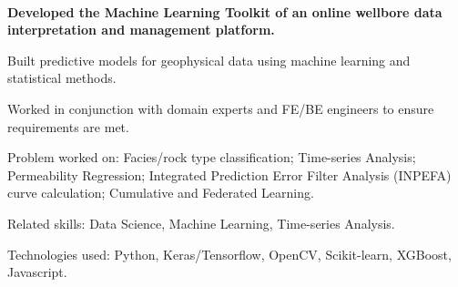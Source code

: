 \\
\vspace{-.2em}
\begin{xitemize}
    \item \textbf{Developed the Machine Learning Toolkit of an online wellbore data interpretation and management platform.}
    \begin{zitemize}
        \item Built predictive models for geophysical data using machine learning and statistical methods.
        \item Worked in conjunction with domain experts and FE/BE engineers to ensure requirements are met.
        \item Problem worked on: Facies/rock type classification; Time-series Analysis; Permeability Regression; Integrated Prediction Error Filter Analysis (INPEFA) curve calculation; Cumulative and Federated Learning.
    \end{zitemize}
    \item Related skills: Data Science, Machine Learning, Time-series Analysis.
    \item Technologies used: Python, Keras/Tensorflow, OpenCV, Scikit-learn, XGBoost, Javascript.
\end{xitemize}

